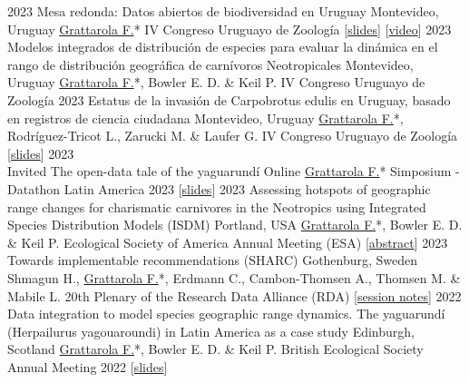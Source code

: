 \documentclass[9pt]{developercv} %
\begin{document}
\begin{entrylist}
	\entrylong
		{2023}
		{Mesa redonda: Datos abiertos de biodiversidad en Uruguay}
		{Montevideo, Uruguay}
		{\underline{Grattarola F.}* \slashsep IV Congreso Uruguayo de Zoología [\href{https://flograttarola.com/talk/datos-abiertos-de-biodiversidad-en-uruguay/Mesa_redonda_datos_abiertosCUZ2023.pdf}{slides}] [\href{https://youtu.be/3hzSsP84u88}{video}]}
	\entrylong
		{2023}
		{Modelos integrados de distribución de especies para evaluar la dinámica en el rango de distribución geográfica de carnívoros Neotropicales}
		{Montevideo, Uruguay}
		{\underline{Grattarola F.}*, Bowler E. D. \& Keil P. \slashsep IV Congreso Uruguayo de Zoología}
	\entrylong
		{2023}
		{Estatus de la invasión de Carpobrotus edulis en Uruguay, basado en registros de ciencia ciudadana}
		{Montevideo, Uruguay}
		{\underline{Grattarola F.}*, Rodríguez-Tricot L., Zarucki M. \& Laufer G. \slashsep IV Congreso Uruguayo de Zoología [\href{https://flograttarola.com/talk/estatus-de-la-invasion-de-carpobrotus-edulis-en-uruguay-basado-en-registros-de-ciencia-ciudadana/Carpobrotus_edulis_CUZ2023.pdf}{slides}]}
		\entrylong
		{2023\\\footnotesize{Invited}}
		{The open-data tale of the yaguarundí}
		{Online}
		{\underline{Grattarola F.}* \slashsep Simposium - Datathon Latin America 2023 [\href{https://flograttarola.com/talk/el-cuento-del-yaguarundi-segun-los-datos-abiertos/simposio_DatatonLatam_2023.pdf}{slides}]}
		\entrylong
		{2023}
		{Assessing hotspots of geographic range changes for charismatic carnivores in the Neotropics using Integrated Species Distribution Models (ISDM)}
		{Portland, USA}
		{\underline{Grattarola F.}*, Bowler E. D. \& Keil P. \slashsep Ecological Society of America Annual Meeting (ESA) [\href{https://esa2023.eventscribe.net/fsPopup.asp?PresentationID=1276990&query=grattarola&Mode=presInfo}{abstract}]}
	\entrylong
		{2023}
		{Towards implementable recommendations (SHARC)}
		{Gothenburg, Sweden}
		{Shmagun H., \underline{Grattarola F.}*, Erdmann C., Cambon-Thomsen A., Thomsen M.  \& Mabile L. \slashsep 20th Plenary of the Research Data Alliance (RDA)  [\href{https://docs.google.com/document/d/1oQRp8EjHEOrmLj5QlqANM31q-AQa-CvJ804TRc9Re6I/edit?usp=sharing}{session notes}]}
	\entrylong
		{2022}
		{Data integration to model species geographic range dynamics. The yaguarundí (Herpailurus yagouaroundi) in Latin America as a case study}
		{Edinburgh, Scotland}
		{\underline{Grattarola F.}*, Bowler E. D. \& Keil P. \slashsep British Ecological Society Annual Meeting 2022 [\href{https://flograttarola.com/pdf/Grattarola_BES2022_short.pdf}{slides}]}

\end{entrylist}
\end{document}
